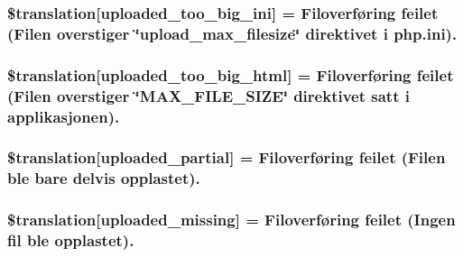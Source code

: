 \subsubsection[{\$translation}]{\setlength{\rightskip}{0pt plus 5cm}\$translation\mbox{[}\textquotesingle{}uploaded\+\_\+too\+\_\+big\+\_\+ini\textquotesingle{}\mbox{]} = \textquotesingle{}Filoverføring feilet (Filen overstiger \char`\"{}upload\+\_\+max\+\_\+filesize\char`\"{} direktivet i php.\+ini).\textquotesingle{}}\label{class_8upload_8no___n_o_8php_a6a08dcd0d3651fdd098568f6b2f0a42c}
\hypertarget{class_8upload_8no___n_o_8php_a623d5b8b92169f57d7e43458aa911cbb}{}
\subsubsection[{\$translation}]{\setlength{\rightskip}{0pt plus 5cm}\$translation\mbox{[}\textquotesingle{}uploaded\+\_\+too\+\_\+big\+\_\+html\textquotesingle{}\mbox{]} = \textquotesingle{}Filoverføring feilet (Filen overstiger \char`\"{}M\+A\+X\+\_\+\+F\+I\+L\+E\+\_\+\+S\+I\+Z\+E\char`\"{} direktivet satt i applikasjonen).\textquotesingle{}}\label{class_8upload_8no___n_o_8php_a623d5b8b92169f57d7e43458aa911cbb}
\hypertarget{class_8upload_8no___n_o_8php_a967c17da21b0a2d3bd65cca3a9ca0ea8}{}
\subsubsection[{\$translation}]{\setlength{\rightskip}{0pt plus 5cm}\$translation\mbox{[}\textquotesingle{}uploaded\+\_\+partial\textquotesingle{}\mbox{]} = \textquotesingle{}Filoverføring feilet (Filen ble bare delvis opplastet).\textquotesingle{}}\label{class_8upload_8no___n_o_8php_a967c17da21b0a2d3bd65cca3a9ca0ea8}
\hypertarget{class_8upload_8no___n_o_8php_a0cce433260be65f1f35853a6b4b8952b}{}
\subsubsection[{\$translation}]{\setlength{\rightskip}{0pt plus 5cm}\$translation\mbox{[}\textquotesingle{}uploaded\+\_\+missing\textquotesingle{}\mbox{]} = \textquotesingle{}Filoverføring feilet (Ingen fil ble opplastet).\textquotesingle{}}\label{class_8upload_8no___n_o_8php_a0cce433260be65f1f35853a6b4b8952b}
\hypertarget{class_8upload_8no___n_o_8php_a4a9168e922b827e6a28b5db1c00774ca}{}
